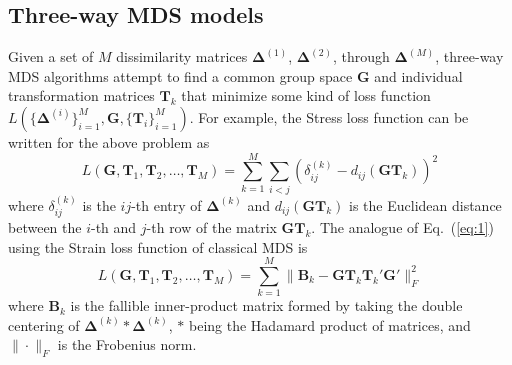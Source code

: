 \documentclass[11pt]{asaproc}
\begin{document}
\subsection{Three-way MDS models}
\label{sec:three-way-mds-1}
Given a set of $M$ dissimilarity matrices $\bm{\Delta}^{(1)}$,
$\bm{\Delta}^{(2)}$, through $\bm{\Delta}^{(M)}$, three-way MDS
algorithms attempt to find a common group space $\mathbf{G}$ and
individual transformation matrices $\mathbf{T}_k$ that minimize some kind
of loss function $L(\{\bm{\Delta}^{(i)}\}_{i=1}^{M}, \mathbf{G},
\{\mathbf{T}_i\}_{i=1}^{M})$. For example, the Stress loss function
\citep{kruskal64:_nonmet} can be written for the above problem as
\begin{equation}
  \label{eq:1}
  L(\mathbf{G}, \mathbf{T}_1, \mathbf{T}_{2}, \dots, \mathbf{T}_M) =
  \sum_{k = 1}^{M}\sum_{i < j} (\delta_{ij}^{(k)} -
  d_{ij}(\mathbf{G}\mathbf{T}_k))^2
\end{equation}
where $\delta_{ij}^{(k)}$ is the $ij$-th entry of $\bm{\Delta}^{(k)}$
and $d_{ij}(\mathbf{G}\mathbf{T}_k)$ is the Euclidean distance between
the $i$-th and $j$-th row of the matrix
$\mathbf{G}\mathbf{T}_k$. The analogue of Eq.~(\ref{eq:1}) using the
Strain loss function of classical MDS \citep{torgesen52:_multid,gower66:_some} is 
\begin{equation}
  \label{eq:2}
  L(\mathbf{G}, \mathbf{T}_1, \mathbf{T}_2, \dots, \mathbf{T}_M)
  = \sum_{k = 1}^{M}\| \mathbf{B}_k -
  \mathbf{G}\mathbf{T}_k \mathbf{T}_k' \mathbf{G}' \|_F^2 
\end{equation}
where $\mathbf{B}_k$ is the fallible inner-product
matrix formed by taking the double centering of $\bm{\Delta}^{(k)}
\ast \bm{\Delta}^{(k)}$, $\ast$ being the Hadamard product of
matrices, and $\| \cdot \|_F$ is the Frobenius norm. \\ \\ 
\end{document}
